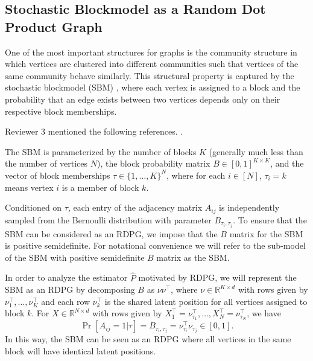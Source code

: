 \documentclass[10pt,letterpaper]{article}
\renewcommand{\Re}{\mathbb{R}}
\renewcommand{\hat}{\widehat}
\begin{document}
\subsection{Stochastic Blockmodel as a Random Dot Product Graph}
\label{section:sbm_rdpg}
One of the most important structures for graphs is the community structure in which vertices are clustered into different communities such that vertices of the same community behave similarly. This structural property is captured by the stochastic blockmodel (SBM) \citep{holland1983stochastic}, where each vertex is assigned to a block and the probability that an edge exists between two vertices depends only on their respective block memberships.

Reviewer 3 mentioned the following references. \cite{ambroise2012new, wolfe2013nonparametric, choi2012stochastic, picard2009deciphering, zanghi2008fast, zanghi2010clustering, pavlovic2014stochastic, daudin2008mixture}.


The SBM is parameterized by the number of blocks $K$ (generally much less than the number of vertices $N$), the block probability matrix $B \in [0,1]^{K \times K}$, and the vector of block memberships
$\tau\in\{1,\dotsc,K\}^N$, where for each $i \in [N]$, $\tau_i = k$ means vertex $i$ is a member of block $k$.

Conditioned on $\tau$, each entry of the adjacency matrix $A_{ij}$ is independently sampled from the Bernoulli distribution with parameter $B_{\tau_i,\tau_j}$.
To ensure that the SBM can be considered as an RDPG, we impose that the $B$ matrix for the SBM is positive semidefinite. 
For notational convenience we will refer to the sub-model of the SBM with positive semidefinite $B$ matrix as the SBM.

In order to analyze the estimator $\hat{P}$ motivated by RDPG, we will represent the SBM as an RDPG by
decomposing $B$ as $\nu \nu^{\top}$, where $\nu \in \Re^{K \times d}$ with rows given by $\nu_1^{\top}, \dotsc, \nu_K^{\top}$ and each row $\nu_k^{\top}$ is the shared latent position for all vertices assigned to block $k$. 
For $X \in \Re^{N \times d}$ with rows given by $X_1^{\top} = \nu_{\tau_1}^{\top}, \dotsc, X_N^{\top} = \nu_{\tau_N}^{\top}$, we have
\[
    \Pr[A_{ij} = 1|\tau] = B_{\tau_i, \tau_j} = \nu_{\tau_i}^{\top} \nu_{\tau_j}^{\phantom{\top}} \in [0, 1].
\]
In this way, the SBM can be seen as an RDPG where all vertices in the same block will have identical latent positions.
\end{document}
